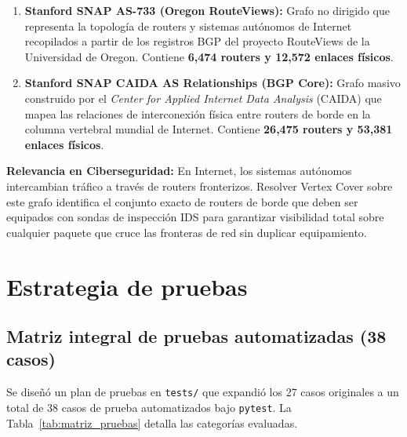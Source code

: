 \documentclass[11pt,a4paper]{article}
\begin{document}
\begin{enumerate}
	\item \textbf{Stanford SNAP AS-733 (Oregon RouteViews):} 
	Grafo no dirigido que representa la topología de routers y sistemas autónomos de Internet recopilados a partir de los registros BGP del proyecto RouteViews de la Universidad de Oregon. Contiene \textbf{6,474 routers y 12,572 enlaces físicos}.
	\item \textbf{Stanford SNAP CAIDA AS Relationships (BGP Core):} 
	Grafo masivo construido por el \textit{Center for Applied Internet Data Analysis} (CAIDA) que mapea las relaciones de interconexión física entre routers de borde en la columna vertebral mundial de Internet. Contiene \textbf{26,475 routers y 53,381 enlaces físicos}.
\end{enumerate}

\textbf{Relevancia en Ciberseguridad:} En Internet, los sistemas autónomos intercambian tráfico a través de routers fronterizos. Resolver Vertex Cover sobre este grafo identifica el conjunto exacto de routers de borde que deben ser equipados con sondas de inspección IDS para garantizar visibilidad total sobre cualquier paquete que cruce las fronteras de red sin duplicar equipamiento.

\section{Estrategia de pruebas}
\label{sec:pruebas}

\subsection{Matriz integral de pruebas automatizadas (38 casos)}
Se diseñó un plan de pruebas en \texttt{tests/} que expandió los 27 casos originales a un total de 38 casos de prueba automatizados bajo \texttt{pytest}. La Tabla~\ref{tab:matriz_pruebas} detalla las categorías evaluadas.
\end{document}
